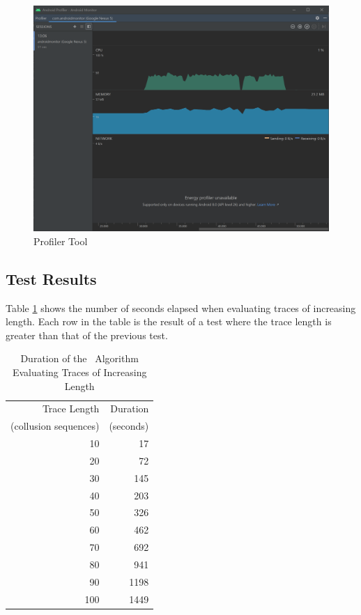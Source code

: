 \begin{figure}[h!]
\centering
\includegraphics[width=\textwidth]{graphics/AndroidStudioProfiler3}
\caption{Profiler Tool}
\label{fig:androidProfiler}
\end{figure}

\newpage

\subsection{Test Results}
\label{subsec:PracticalPerformanceAnalysisResults}

Table \ref{tab:StandardRHExecutionTimes} shows the number of seconds elapsed when evaluating traces of increasing length.  Each row in the table is the result of a test where the trace length is greater than that of the previous test.

\begin{table}[h!]
	\centering
	\captionsetup{width=0.6\linewidth, justification=centering}
	\begin{tabular}{r|r} 
	Trace Length  & Duration\\
	(collusion sequences) & (seconds)\\
	\hline
	10 & 17\\
	20 & 72\\
	30 & 145\\
	40 & 203\\
	50 & 326\\
	60 & 462\\
	70 & 692\\
	80 & 941\\
	90 & 1198\\
	100 & 1449\\
	\hline
	\end{tabular}
	\caption{Duration of the \RH\ Algorithm Evaluating Traces of Increasing Length}
	\label{tab:StandardRHExecutionTimes}
\end{table}

